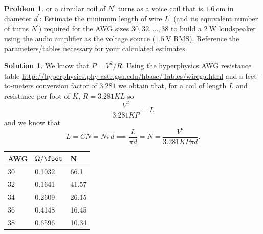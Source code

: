 \documentclass[10pt]{article}
\theoremstyle{definition}
\newtheorem{problem}{Problem}
\newtheorem{soln}{Solution}
\newcommand{\pr}[1]{{#1^\prime}}
\begin{document}
\begin{problem}
or a circular coil of $\pr{N}$ turns as a voice coil that is $\qty{1.6}{\centi\meter}$ in diameter $\pr{d}$: Estimate the minimum
length of wire $\pr{L}$ (and its equivalent number of turns $\pr{N}$) required for the AWG sizes $30,32,\dots, 38$ to build a
$\qty{2}{\watt}$ loudspeaker using the audio amplifier as the voltage source ($\qty{1.5}{\volt}$ RMS). Reference the parameters/tables
necessary for your calculated estimates.
\end{problem}
\begin{soln}
  We know that $P=V^2/R$. Using the hyperphysics AWG resistance table \url{http://hyperphysics.phy-astr.gsu.edu/hbase/Tables/wirega.html} and a feet-to-meters conversion factor of $3.281$ we obtain that, for a coil of
  length $L$ and resistance per foot of $K$, $R= 3.281KL$ so
  $$\frac{V^2}{3.281 KP}=L$$
  and we know that
  $$L=CN=N\pi d\implies \frac{L}{\pi d}=N=\frac{V^2}{3.281 KP\pi d}.$$

  \begin{table}[ht!]
    \centering%
    \begin{tabular}{lll}
      \toprule
      AWG & $\unit{\ohm\per\foot}$ & N     \\
      \midrule
      30  & 0.1032                 & 66.1  \\
      32  & 0.1641                 & 41.57 \\
      34  & 0.2609                 & 26.15 \\
      36  & 0.4148                 & 16.45 \\
      38  & 0.6596                 & 10.34 \\
      \bottomrule
    \end{tabular}
  \end{table}



\end{soln}
\end{document}
